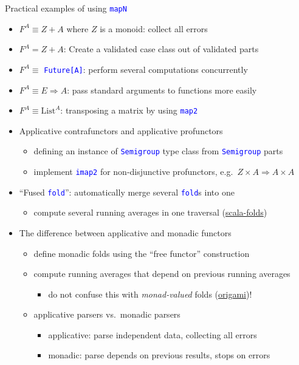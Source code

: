\documentclass[english]{beamer}
\begin{document}
\begin{frame}{Practical examples of using \texttt{\textcolor{blue}{\footnotesize{}mapN}} }
\begin{itemize}
\item \vspace{-0.2cm}$F^{A}\equiv Z+A$ where $Z$ is a monoid: collect
all errors
\item $F^{A}=Z+A$: Create a validated case class out of validated parts
\item $F^{A}\equiv$ \texttt{\textcolor{blue}{\footnotesize{}Future{[}A{]}}}:
perform several computations concurrently
\item $F^{A}\equiv E\Rightarrow A$: pass standard arguments to functions
more easily
\item $F^{A}\equiv\text{List}^{A}$: transposing a matrix by using \texttt{\textcolor{blue}{\footnotesize{}map2}} 
\item Applicative contrafunctors and applicative profunctors
\begin{itemize}
\item defining an instance of \texttt{\textcolor{blue}{\footnotesize{}Semigroup}}
type class from \texttt{\textcolor{blue}{\footnotesize{}Semigroup}}
parts
\item implement \texttt{\textcolor{blue}{\footnotesize{}imap2}} for non-disjunctive
profunctors, e.g.\ $Z\times A\Rightarrow A\times A$
\end{itemize}
\item ``Fused \texttt{\textcolor{blue}{\footnotesize{}fold}}'': automatically
merge several \texttt{\textcolor{blue}{\footnotesize{}fold}}s into
one
\begin{itemize}
\item compute several running averages in one traversal (\href{https://github.com/amarpotghan/scala-fold}{scala-folds})
\end{itemize}
\item The difference between applicative and monadic functors
\begin{itemize}
\item define monadic folds using the ``free functor'' construction
\item compute running averages that depend on previous running averages
\begin{itemize}
\item do not confuse this with \emph{monad-valued} folds (\href{https://github.com/atnos-org/origami}{origami})!
\end{itemize}
\item applicative parsers vs.\ monadic parsers
\begin{itemize}
\item applicative: parse independent data, collecting all errors
\item monadic: parse depends on previous results, stops on errors
\end{itemize}
\end{itemize}
\end{itemize}
\end{frame}
\end{document}
